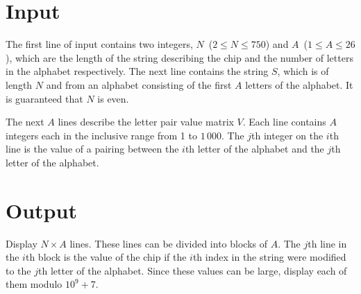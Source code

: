 \section*{Input}

The first line of input contains two integers, $N$~($2 \leq N \leq 750$) and $A$~($1 \leq A \leq 26$), which are the length of the string describing the chip and the number of letters in the alphabet respectively. The next line contains the string $S$, which is of length $N$ and from an alphabet consisting of the first $A$ letters of the alphabet. It is guaranteed that $N$ is even.

The next $A$ lines describe the letter pair value matrix $V$. Each line contains $A$ integers each in the inclusive range from 1 to $1\,000$. The $j$th integer on the $i$th line is the value of a pairing between the $i$th letter of the alphabet and the $j$th letter of the alphabet.


\section*{Output}

Display $N \times A$ lines. These lines can be divided into blocks of $A$. The $j$th line in the $i$th block is the value of the chip if the $i$th index in the string were modified to the $j$th letter of the alphabet. Since these values can be large, display each of them modulo $10^9+7$.
